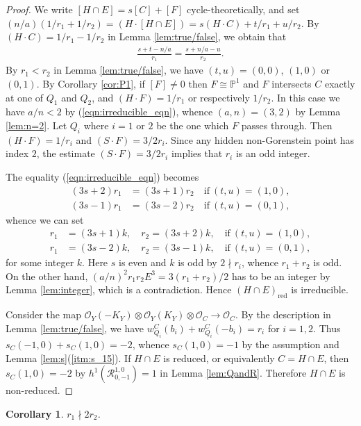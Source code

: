 \documentclass[a4paper,11pt]{amsart}
\newtheorem{corollary}[theorem]{Corollary}
\theoremstyle{definition}
\theoremstyle{remark}
\numberwithin{equation}{section}
\newcommand{\bP}{{\mathbb P}}
\newcommand{\cO}{{\mathcal O}}
\newcommand{\calR}{{\mathcal R}}
\newcommand{\red}{\mathrm{red}}
\begin{document}
\begin{proof}
We write $[H \cap E]=s[C]+[F]$ cycle-theoretically,
and set $(n/a)(1/r_1+1/r_2)=(H \cdot [H \cap E])=s(H \cdot C)+t/r_1+u/r_2$.
By $(H \cdot C)=1/r_1-1/r_2$ in Lemma \ref{lem:true/false},
we obtain that
\begin{align}\label{eqn:irreducible_eqn}
\frac{s+t-n/a}{r_1}=\frac{s+n/a-u}{r_2}.
\end{align}
By $r_1<r_2$ in Lemma \ref{lem:true/false},
we have $(t,u)=(0,0)$, $(1,0)$ or $(0,1)$.
By Corollary \ref{cor:P1},
if $[F]\neq0$ then $F\cong\bP^1$ and
$F$ intersects $C$ exactly at one of $Q_1$ and $Q_2$,
and $(H \cdot F)=1/r_1$ or respectively $1/r_2$.
In this case we have $a/n<2$ by (\ref{eqn:irreducible_eqn}),
whence $(a,n)=(3,2)$ by Lemma \ref{lem:n=2}.
Let $Q_i$ where $i=1$ or $2$ be the one which $F$ passes through.
Then $(H \cdot F)=1/r_i$ and $(S \cdot F)=3/2r_i$.
Since any hidden non-Gorenstein point has index $2$,
the estimate $(S \cdot F)=3/2r_i$ implies that $r_i$ is an odd integer.

The equality (\ref{eqn:irreducible_eqn}) becomes
\begin{align*}
(3s+2)r_1&=(3s+1)r_2 \quad \textrm{if} \ (t,u)=(1,0), \\
(3s-1)r_1&=(3s-2)r_2 \quad \textrm{if} \ (t,u)=(0,1),
\end{align*}
whence we can set
\begin{align*}
r_1&=(3s+1)k,\quad r_2=(3s+2)k, \quad \textrm{if} \ (t,u)=(1,0), \\
r_1&=(3s-2)k,\quad r_2=(3s-1)k, \quad \textrm{if} \ (t,u)=(0,1),
\end{align*}
for some integer $k$.
Here $s$ is even and $k$ is odd by $2 \nmid r_i$,
whence $r_1+r_2$ is odd.
On the other hand,
$(a/n)^2r_1r_2E^3=3(r_1+r_2)/2$
has to be an integer by Lemma \ref{lem:integer},
which is a contradiction.
Hence $(H \cap E)_\red$ is irreducible.

Consider the map
$\cO_Y(-K_Y) \otimes \cO_Y(K_Y) \otimes \cO_C \to \cO_C$.
By the description in Lemma \ref{lem:true/false},
we have $w_{Q_i}^C(b_i)+w_{Q_i}^C(-b_i)=r_i$ for $i=1,2$.
Thus $s_C(-1,0)+s_C(1,0)=-2$, whence $s_C(1,0)=-1$
by the assumption and Lemma \ref{lem:s}(\ref{itm:s_15}).
If $H \cap E$ is reduced, or equivalently $C=H \cap E$,
then $s_C(1,0)=-2$ by $h^1(\calR_{0,-1}^{1,0})=1$ in Lemma \ref{lem:QandR}.
Therefore $H \cap E$ is non-reduced.
\end{proof}

\begin{corollary}\label{cor:nmid}
$r_1 \nmid 2r_2$.
\end{corollary}
\end{document}
